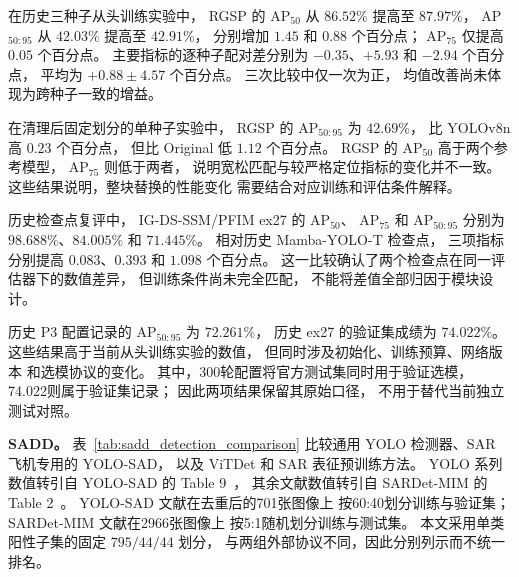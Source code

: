 在历史三种子从头训练实验中，
RGSP 的 AP$_{50}$ 从 $86.52\%$ 提高至 $87.97\%$，
AP$_{50:95}$ 从 $42.03\%$ 提高至 $42.91\%$，
分别增加 $1.45$ 和 $0.88$ 个百分点；
AP$_{75}$ 仅提高 $0.05$ 个百分点。
主要指标的逐种子配对差分别为
$-0.35$、$+5.93$ 和 $-2.94$ 个百分点，
平均为 $+0.88\pm4.57$ 个百分点。
三次比较中仅一次为正，
均值改善尚未体现为跨种子一致的增益。

在清理后固定划分的单种子实验中，
RGSP 的 AP$_{50:95}$ 为 $42.69\%$，
比 YOLOv8n 高 $0.23$ 个百分点，
但比 Original 低 $1.12$ 个百分点。
RGSP 的 AP$_{50}$ 高于两个参考模型，
AP$_{75}$ 则低于两者，
说明宽松匹配与较严格定位指标的变化并不一致。
这些结果说明，整块替换的性能变化
需要结合对应训练和评估条件解释。

历史检查点复评中，
IG-DS-SSM/PFIM ex27 的 AP$_{50}$、
AP$_{75}$ 和 AP$_{50:95}$
分别为 $98.688\%$、$84.005\%$ 和 $71.445\%$。
相对历史 Mamba-YOLO-T 检查点，
三项指标分别提高 $0.083$、$0.393$
和 $1.098$ 个百分点。
这一比较确认了两个检查点在同一评估器下的数值差异，
但训练条件尚未完全匹配，
不能将差值全部归因于模块设计。

历史 P3 配置记录的 AP$_{50:95}$ 为 $72.261\%$，
历史 ex27 的验证集成绩为 $74.022\%$。
这些结果高于当前从头训练实验的数值，
但同时涉及初始化、训练预算、网络版本
和选模协议的变化。
其中，300轮配置将官方测试集同时用于验证选模，
74.022则属于验证集记录；
因此两项结果保留其原始口径，
不用于替代当前独立测试对照。

\textbf{SADD。}
表~\ref{tab:sadd_detection_comparison}
比较通用 YOLO 检测器、SAR 飞机专用的 YOLO-SAD，
以及 ViTDet 和 SAR 表征预训练方法。
YOLO 系列数值转引自 YOLO-SAD 的 Table 9~\cite{yolosad2024}，
其余文献数值转引自 SARDet-MIM 的 Table 2~\cite{sardetmim2026}。
YOLO-SAD 文献在去重后的701张图像上
按60:40划分训练与验证集；
SARDet-MIM 文献在2966张图像上
按5:1随机划分训练与测试集。
本文采用单类阳性子集的固定 $795/44/44$ 划分，
与两组外部协议不同，因此分别列示而不统一排名。

